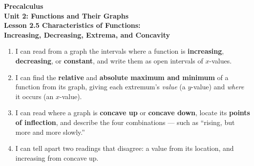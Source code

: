 \documentclass[10pt]{article}
\begin{document}
\vspace{-0.8in}

\begin{center}
  {\color{white}\textbf{\LARGE Precalculus}}\\[4pt]
  {\color{lilacmid}\large\textbf{Unit 2: Functions and Their Graphs}}\\[6pt]
  {\color{white}\textbf{\large Lesson 2.5 \quad Characteristics of Functions:}}\\[2pt]
  {\color{white}\textbf{\large Increasing, Decreasing, Extrema, and Concavity}}
\end{center}

\vspace{0.22in}
\namedateperiod
\vspace{0.18in}

\begin{learningtargetbox}
\small
\begin{enumerate}[leftmargin=1.5em, itemsep=5pt]
  \item I can read from a graph the intervals where a function is \textbf{increasing},
        \textbf{decreasing}, or \textbf{constant}, and write them as open intervals of
        $x$-values.
  \item I can find the \textbf{relative} and \textbf{absolute maximum and minimum} of a
        function from its graph, giving each extremum's \emph{value} (a $y$-value) and
        \emph{where} it occurs (an $x$-value).
  \item I can read where a graph is \textbf{concave up} or \textbf{concave down}, locate its
        \textbf{points of inflection}, and describe the four combinations --- such as
        ``rising, but more and more slowly.''
  \item I can tell apart two readings that disagree: a value from its location, and
        increasing from concave up.
\end{enumerate}
\end{learningtargetbox}

\vspace{0.14in}
\end{document}
